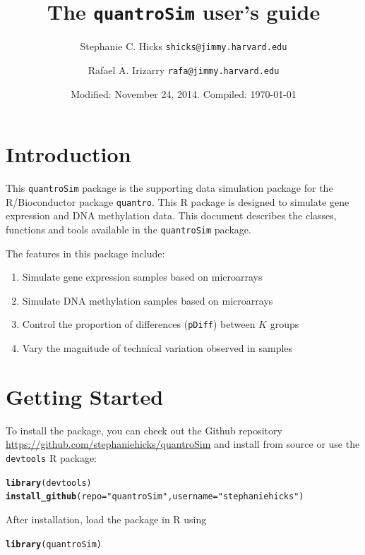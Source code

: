 \documentclass{article}\usepackage[]{graphicx}\usepackage[usenames,dvipsnames]{color}
\title{The \texttt{quantroSim} user's guide}
\author{Stephanie C. Hicks \texttt{shicks@jimmy.harvard.edu} \and
Rafael A. Irizarry \texttt{rafa@jimmy.harvard.edu} }
\date{Modified: November 24, 2014.  Compiled: \today}
\makeatletter
\newcommand{\hlstr}[1]{\textcolor[rgb]{0.192,0.494,0.8}{#1}}%
\newcommand{\hlstd}[1]{\textcolor[rgb]{0.345,0.345,0.345}{#1}}%
\newcommand{\hlkwc}[1]{\textcolor[rgb]{0.333,0.667,0.333}{#1}}%
\newcommand{\hlkwd}[1]{\textcolor[rgb]{0.737,0.353,0.396}{\textbf{#1}}}%
\newenvironment{kframe}{%
 \def\at@end@of@kframe{}%
 \ifinner\ifhmode%
  \def\at@end@of@kframe{\end{minipage}}%
  \begin{minipage}{\columnwidth}%
 \fi\fi%
 \def\FrameCommand##1{\hskip\@totalleftmargin \hskip-\fboxsep
 \colorbox{shadecolor}{##1}\hskip-\fboxsep
     \hskip-\linewidth \hskip-\@totalleftmargin \hskip\columnwidth}%
 \MakeFramed {\advance\hsize-\width
   \@totalleftmargin\z@ \linewidth\hsize
   \@setminipage}}%
 {\par\unskip\endMakeFramed%
 \at@end@of@kframe}
\newenvironment{knitrout}{}{} %
\makeatother
\begin{document}
\maketitle
 
\tableofcontents

\section{Introduction}

This \texttt{quantroSim} package is the supporting data simulation 
package for the R/Bioconductor package \texttt{quantro}.  This 
R package is designed to simulate gene expression and DNA methylation
data. This document describes the classes, functions and tools 
available in the \texttt{quantroSim} package. 

The features in this package include: 

\begin{enumerate} 
\item Simulate gene expression samples based on microarrays
\item Simulate DNA methylation samples based on microarrays
\item Control the proportion of differences (\texttt{pDiff}) between $K$ groups
\item Vary the magnitude of technical variation observed in samples
\end{enumerate}

\section{Getting Started}

To install the package, you can check out the Github repository 
\url{https://github.com/stephaniehicks/quantroSim} and install from source 
or use the \texttt{devtools} R package:

\begin{knitrout}
\color{fgcolor}\begin{kframe}
\begin{alltt}
\hlkwd{library}\hlstd{(devtools)}
\hlkwd{install_github}\hlstd{(}\hlkwc{repo} \hlstd{=} \hlstr{"quantroSim"}\hlstd{,} \hlkwc{username} \hlstd{=} \hlstr{"stephaniehicks"}\hlstd{)}
\end{alltt}
\end{kframe}
\end{knitrout}

After installation, load the package in R using
\begin{knitrout}
\color{fgcolor}\begin{kframe}
\begin{alltt}
\hlkwd{library}\hlstd{(quantroSim)}
\end{alltt}
\end{kframe}
\end{knitrout}
\end{document}
